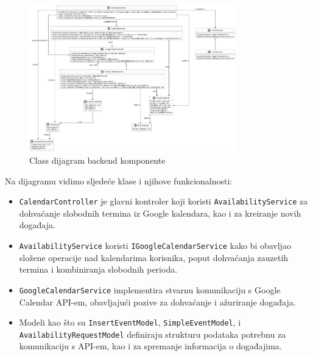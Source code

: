 \documentclass{foi}
\begin{document}
\begin{figure}[H]
    \centering
    \includegraphics[width=0.8\textwidth]{slike/MeetingPlannerAPI_ClassUML.png}
    \caption{Class dijagram backend komponente}
    \label{fig:backend-uml}
\end{figure}

Na dijagramu vidimo sljedeće klase i njihove funkcionalnosti:
\begin{itemize}
    \item \texttt{CalendarController} je glavni kontroler koji koristi \texttt{AvailabilityService} za dohvaćanje slobodnih termina iz Google kalendara, kao i za kreiranje novih događaja.
    \item \texttt{AvailabilityService} koristi \texttt{IGoogleCalendarService} kako bi obavljao složene operacije nad kalendarima korisnika, poput dohvaćanja zauzetih termina i kombiniranja slobodnih perioda.
    \item \texttt{GoogleCalendarService} implementira stvarnu komunikaciju s Google Calendar API-em, obavljajući pozive za dohvaćanje i ažuriranje događaja.
    \item Modeli kao što su \texttt{InsertEventModel}, \texttt{SimpleEventModel}, i \texttt{AvailabilityRequestModel} definiraju strukturu podataka potrebnu za komunikaciju s API-em, kao i za spremanje informacija o događajima.
\end{itemize}
\end{document}
